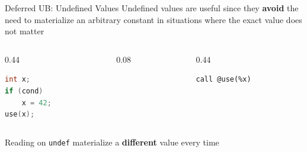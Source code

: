 \begin{frame}[fragile]{Deferred UB: Undefined Values}
  Undefined values are useful since they \textbf{avoid} the need to materialize an arbitrary constant in situations where the exact value does not matter
    \begin{columns}[c]
       \begin{column}{0.44\textwidth}
        \begin{lstlisting}[language=C, frame=single, xleftmargin=4pt, xrightmargin=4pt]
int x;
if (cond)
    x = 42;
use(x);
        \end{lstlisting}
       \end{column}
       \begin{column}{0.08\textwidth}
           \transform
       \end{column}
       \begin{column}{0.44\textwidth}
           \begin{lstlisting}[style=llvmmono]
%x = select %cond, 42, undef 
call @use(%x)
           \end{lstlisting}
       \end{column}
    \end{columns}
    Reading on \texttt{undef} materialize a \textbf{different} value every time
\end{frame}
